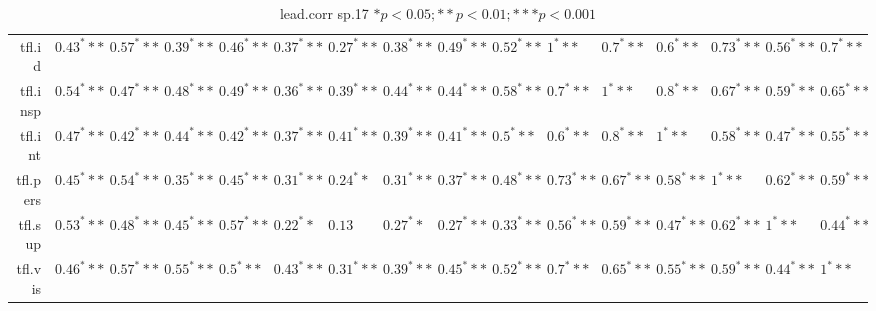 \begin{table}[ht]
\begin{tabular}{rlllllllllllllll}
  tfl.id & $0.43^***$ & $0.57^***$ & $0.39^***$ & $0.46^***$ & $0.37^***$ & $0.27^***$ & $0.38^***$ & $0.49^***$ & $0.52^***$ & $1^***$ & $0.7^***$ & $0.6^***$ & $0.73^***$ & $0.56^***$ & $0.7^***$ \\ 
  tfl.insp & $0.54^***$ & $0.47^***$ & $0.48^***$ & $0.49^***$ & $0.36^***$ & $0.39^***$ & $0.44^***$ & $0.44^***$ & $0.58^***$ & $0.7^***$ & $1^***$ & $0.8^***$ & $0.67^***$ & $0.59^***$ & $0.65^***$ \\ 
  tfl.int & $0.47^***$ & $0.42^***$ & $0.44^***$ & $0.42^***$ & $0.37^***$ & $0.41^***$ & $0.39^***$ & $0.41^***$ & $0.5^***$ & $0.6^***$ & $0.8^***$ & $1^***$ & $0.58^***$ & $0.47^***$ & $0.55^***$ \\ 
  tfl.pers & $0.45^***$ & $0.54^***$ & $0.35^***$ & $0.45^***$ & $0.31^***$ & $0.24^**$ & $0.31^***$ & $0.37^***$ & $0.48^***$ & $0.73^***$ & $0.67^***$ & $0.58^***$ & $1^***$ & $0.62^***$ & $0.59^***$ \\ 
  tfl.sup & $0.53^***$ & $0.48^***$ & $0.45^***$ & $0.57^***$ & $0.22^**$ & $0.13$ & $0.27^**$ & $0.27^***$ & $0.33^***$ & $0.56^***$ & $0.59^***$ & $0.47^***$ & $0.62^***$ & $1^***$ & $0.44^***$ \\ 
  tfl.vis & $0.46^***$ & $0.57^***$ & $0.55^***$ & $0.5^***$ & $0.43^***$ & $0.31^***$ & $0.39^***$ & $0.45^***$ & $0.52^***$ & $0.7^***$ & $0.65^***$ & $0.55^***$ & $0.59^***$ & $0.44^***$ & $1^***$ \\ 
   \hline
\end{tabular}
\caption{lead.corr sp.17 $* p < 0.05; ** p < 0.01; *** p < 0.001$} 
\end{table}
